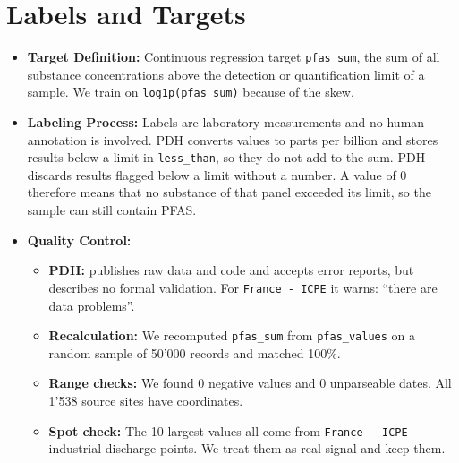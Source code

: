 \documentclass[11pt, a4paper]{article}
\newcommand{\code}[1]{\texttt{#1}}
\begin{document}
\section{Labels and Targets}
\begin{itemize}
    \item \textbf{Target Definition:} Continuous regression target \code{pfas\_sum}, the sum of all substance concentrations above the detection or quantification limit of a sample. We train on \code{log1p(pfas\_sum)} because of the skew.
    \item \textbf{Labeling Process:} Labels are laboratory measurements and no human annotation is involved. PDH converts values to parts per billion and stores results below a limit in \code{less\_than}, so they do not add to the sum. PDH discards results flagged below a limit without a number. A value of 0 therefore means that no substance of that panel exceeded its limit, so the sample can still contain PFAS.
    \item \textbf{Quality Control:}
    \begin{itemize}
        \item \textbf{PDH:} publishes raw data and code and accepts error reports, but describes no formal validation. For \code{France - ICPE} it warns: ``there are data problems''.
        \item \textbf{Recalculation:} We recomputed \code{pfas\_sum} from \code{pfas\_values} on a random sample of 50'000 records and matched 100\%.
        \item \textbf{Range checks:} We found 0 negative values and 0 unparseable dates. All 1'538 source sites have coordinates.
        \item \textbf{Spot check:} The 10 largest values all come from \code{France - ICPE} industrial discharge points. We treat them as real signal and keep them.
    \end{itemize}
\end{itemize}

\end{document}

